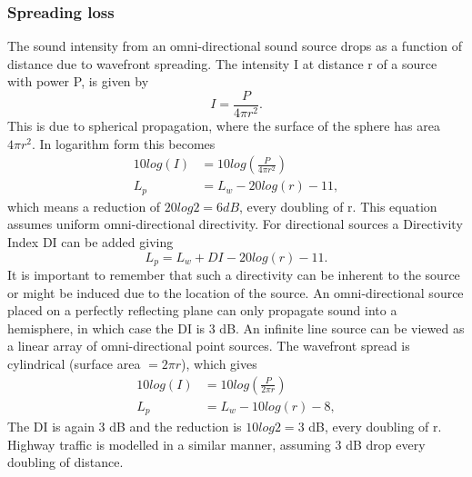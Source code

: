 \subsubsection{Spreading loss} 
The sound intensity from an omni-directional sound source drops as a function of distance due to wavefront spreading. The intensity I at distance r of a source with power P, is given by
\begin{equation}
    I = \frac{P}{4\pi r^2}.
\end{equation}
This is due to spherical propagation, where the surface of the sphere has area $4\pi r^2$. In logarithm form this becomes
\begin{equation}
\begin{split}
    10log(I) &= 10log(\frac{P}{4\pi r^2}) \\
    L_p &= L_w - 20 log(r) - 11,
\end{split}
\end{equation}
which means a reduction of $20log2 = 6 dB$, every doubling of r. This equation assumes uniform omni-directional directivity. For directional sources a Directivity Index DI can be added giving
\begin{equation}
    L_p = L_w + DI - 20 log(r) - 11.
\end{equation}
It is important to remember that such a directivity can be inherent to the source or might be induced due to the location of the source. An omni-directional source placed on a perfectly reflecting plane can only propagate sound into a hemisphere, in which case the DI is 3 dB.  
An infinite line source can be viewed as a linear array of omni-directional point sources. The wavefront spread is cylindrical (surface area $= 2\pi r$),  which gives
\begin{equation}
\begin{split}
    10log(I) &= 10log(\frac{P}{2\pi r}) \\
    L_p &= L_w - 10 log(r) - 8,
\end{split}
\end{equation}
The DI is again 3 dB and the reduction is $10log2 = 3$ dB, every doubling of r. Highway traffic is modelled in a similar manner, assuming 3 dB drop every doubling of distance.
